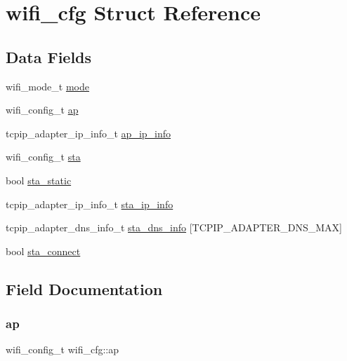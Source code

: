 \hypertarget{structwifi__cfg}{}\section{wifi\+\_\+cfg Struct Reference}
\label{structwifi__cfg}
\subsection*{Data Fields}
\begin{DoxyCompactItemize}
\item 
wifi\+\_\+mode\+\_\+t \mbox{\hyperlink{structwifi__cfg_a5e9dbc35ab4d5b816a9f0affc13e0068}{mode}}
\item 
wifi\+\_\+config\+\_\+t \mbox{\hyperlink{structwifi__cfg_a80d3c5c24182f476ffe57d664909a4a0}{ap}}
\item 
tcpip\+\_\+adapter\+\_\+ip\+\_\+info\+\_\+t \mbox{\hyperlink{structwifi__cfg_a937ab9f789423344a14f78a249f59aa4}{ap\+\_\+ip\+\_\+info}}
\item 
wifi\+\_\+config\+\_\+t \mbox{\hyperlink{structwifi__cfg_ade4bdacd8530339bc13e489670f6c886}{sta}}
\item 
bool \mbox{\hyperlink{structwifi__cfg_abd668cb59692251a5382dad9e4e6c51e}{sta\+\_\+static}}
\item 
tcpip\+\_\+adapter\+\_\+ip\+\_\+info\+\_\+t \mbox{\hyperlink{structwifi__cfg_aa7483bfab435a803a70a5043385dcc05}{sta\+\_\+ip\+\_\+info}}
\item 
tcpip\+\_\+adapter\+\_\+dns\+\_\+info\+\_\+t \mbox{\hyperlink{structwifi__cfg_ad0a27da90280dcce96376d404bebebe8}{sta\+\_\+dns\+\_\+info}} \mbox{[}T\+C\+P\+I\+P\+\_\+\+A\+D\+A\+P\+T\+E\+R\+\_\+\+D\+N\+S\+\_\+\+M\+AX\mbox{]}
\item 
bool \mbox{\hyperlink{structwifi__cfg_afde977289add1255d8b86de8111f6696}{sta\+\_\+connect}}
\end{DoxyCompactItemize}


\subsection{Field Documentation}
\mbox{\label{structwifi__cfg_a80d3c5c24182f476ffe57d664909a4a0}} 
\subsubsection{\texorpdfstring{ap}{ap}}
{\footnotesize\ttfamily wifi\+\_\+config\+\_\+t wifi\+\_\+cfg\+::ap}

